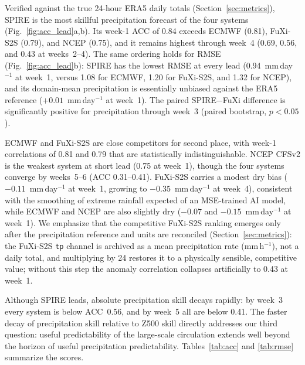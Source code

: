 \documentclass[11pt,a4paper]{article}
\begin{document}
Verified against the true 24-hour ERA5 daily totals
(Section~\ref{sec:metrics}), SPIRE is the most skillful precipitation
forecast of the four systems (Fig.~\ref{fig:acc_lead}a,b). Its week-1
ACC of 0.84 exceeds ECMWF (0.81), FuXi-S2S (0.79), and NCEP (0.75),
and it remains highest through week~4 (0.69, 0.56, and 0.43 at
weeks~2--4). The same ordering holds for RMSE
(Fig.~\ref{fig:acc_lead}b): SPIRE has the lowest RMSE at every lead
(0.94~mm\,day$^{-1}$ at week~1, versus 1.08 for ECMWF, 1.20 for
FuXi-S2S, and 1.32 for NCEP), and its domain-mean precipitation is
essentially unbiased against the ERA5 reference
($+0.01$~mm\,day$^{-1}$ at week~1). The paired SPIRE$-$FuXi difference is significantly positive for
precipitation through week~3 (paired bootstrap, $p<0.05$).

ECMWF and FuXi-S2S are close competitors for second place, with
week-1 correlations of 0.81 and 0.79 that are statistically
indistinguishable. NCEP CFSv2 is the weakest system at short lead (0.75
at week~1), though the four systems converge by weeks~5--6 (ACC
0.31--0.41). FuXi-S2S carries a modest dry bias
($-0.11$~mm\,day$^{-1}$ at week~1, growing to $-0.35$~mm\,day$^{-1}$
at week~4), consistent with the smoothing of extreme rainfall expected of
an MSE-trained AI model, while ECMWF and NCEP are also slightly dry
($-0.07$ and $-0.15$~mm\,day$^{-1}$ at week~1). We emphasize that the
competitive FuXi-S2S ranking emerges only after the precipitation
reference and units are reconciled (Section~\ref{sec:metrics}): the
FuXi-S2S \texttt{tp} channel is archived as a mean precipitation rate
(mm\,h$^{-1}$), not a daily total, and multiplying by 24 restores it to
a physically sensible, competitive value; without this step the anomaly
correlation collapses artificially to 0.43 at week~1.

Although SPIRE leads, absolute precipitation skill decays rapidly: by
week~3 every system is below ACC~0.56, and by week~5 all are
below 0.41. The faster decay of precipitation skill relative to Z500
skill directly addresses our third question: useful predictability of the
large-scale circulation extends well beyond the horizon of useful
precipitation predictability. Tables~\ref{tab:acc} and \ref{tab:rmse}
summarize the scores.
\end{document}
